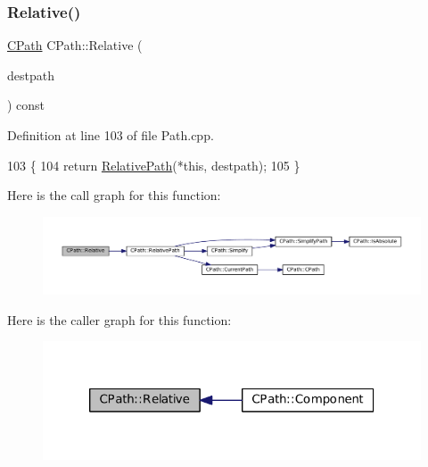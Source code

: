 \subsubsection{\texorpdfstring{Relative()}{Relative()}}
{\footnotesize\ttfamily \hyperlink{classCPath}{C\+Path} C\+Path\+::\+Relative (\begin{DoxyParamCaption}\item[{const \hyperlink{classCPath}{C\+Path} \&}]{destpath }\end{DoxyParamCaption}) const}



Definition at line 103 of file Path.\+cpp.


\begin{DoxyCode}
103                                                 \{
104     \textcolor{keywordflow}{return} \hyperlink{classCPath_a76f73670ecc0a434c2f8a1ea0f1a040e}{RelativePath}(*\textcolor{keyword}{this}, destpath);
105 \}
\end{DoxyCode}
Here is the call graph for this function\+:\nopagebreak
\begin{figure}[H]
\begin{center}
\leavevmode
\includegraphics[width=350pt]{classCPath_aaf49ee9d0f8ed1ffa6bb5e18aba86b4f_cgraph}
\end{center}
\end{figure}
Here is the caller graph for this function\+:\nopagebreak
\begin{figure}[H]
\begin{center}
\leavevmode
\includegraphics[width=320pt]{classCPath_aaf49ee9d0f8ed1ffa6bb5e18aba86b4f_icgraph}
\end{center}
\end{figure}
\hypertarget{classCPath_a76f73670ecc0a434c2f8a1ea0f1a040e}{}\label{classCPath_a76f73670ecc0a434c2f8a1ea0f1a040e} 
